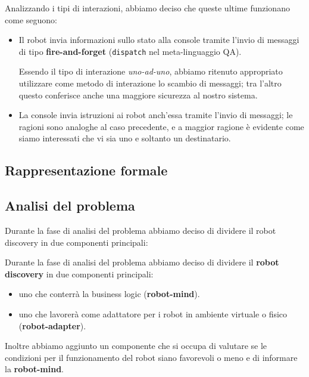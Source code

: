 Analizzando i tipi di interazioni, abbiamo deciso che queste ultime funzionano come seguono:

\begin{itemize}
  \item
    Il robot invia informazioni sullo stato alla console tramite l'invio di messaggi di tipo \textbf{fire-and-forget}
    (\texttt{dispatch} nel meta-linguaggio QA).

    Essendo il tipo di interazione \textit{uno-ad-uno}, abbiamo ritenuto appropriato utilizzare come metodo di interazione lo scambio di messaggi;
    tra l'altro questo conferisce anche una maggiore sicurezza al nostro sistema.

  \item
    La console invia istruzioni ai robot anch'essa tramite l'invio di messaggi;
    le ragioni sono analoghe al caso precedente,
    e a maggior ragione è evidente come siamo interessati che vi sia uno e soltanto un destinatario.

\end{itemize}

\subsection{Rappresentazione formale}



\subsection{Analisi del problema}

Durante la fase di analisi del problema abbiamo deciso di dividere il robot discovery in due componenti principali:

Durante la fase di analisi del problema abbiamo deciso di dividere il \textbf{robot discovery} in due componenti principali:

\begin{itemize}
  \item uno che conterrà la business logic (\textbf{robot-mind}).
  \item uno che lavorerà come adattatore per i robot in ambiente virtuale o fisico (\textbf{robot-adapter}).
\end{itemize}

Inoltre abbiamo aggiunto un componente che si occupa di valutare se le condizioni per il funzionamento del robot siano favorevoli o meno e di informare la \textbf{robot-mind}.

